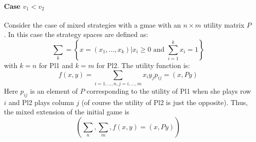 \paragraph*{Case $v_1<v_2$}
Consider the case of mixed strategies with a gmae with an $n\times m$ utility matrix $P$. 
In this case the strategy spaces are defined as: 
\[\sum_k=\left\{x=(x_1,\dots,x_k)|x_i\geq 0 \text{ and }\sum_{i=1}^{k}x_i=1\right\}\]
with $k = n$ for Pl1 and $k = m$ for Pl2. 
The utility function is: 
\[f(x,y)=\sum_{i=1,\dots,n,j=i,\dots,m}x_iy_jp_{ij}=(x,Py)\]
Here $p_{ij}$ is an element of $P$ corresponding to the utility of Pl1 when she plays
row $i$ and Pl2 plays column $j$ (of course the utility of Pl2 is just the opposite). 
Thus, the mixed extension of the initial game is 
\[\left(\sum_n, \sum_m, f (x, y) = (x, Py)\right)\]


